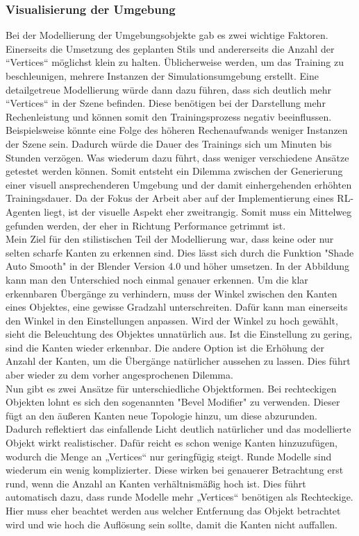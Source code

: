 \subsubsection{Visualisierung der Umgebung}
\label{vis_umgebung}
Bei der Modellierung der Umgebungsobjekte gab es zwei wichtige Faktoren. Einerseits die Umsetzung des geplanten Stils und andererseits die Anzahl der “Vertices“ möglichst klein zu halten. Üblicherweise werden, um das Training zu beschleunigen, mehrere Instanzen der Simulationsumgebung erstellt. Eine detailgetreue Modellierung würde dann dazu führen, dass sich deutlich mehr “Vertices“ in der Szene befinden. Diese benötigen bei der Darstellung mehr Rechenleistung und können somit den Trainingsprozess negativ beeinflussen. Beispielsweise könnte eine Folge des höheren Rechenaufwands weniger Instanzen der Szene sein. Dadurch würde die Dauer des Trainings sich um Minuten bis Stunden verzögen. Was wiederum dazu führt, dass weniger verschiedene Ansätze getestet werden können. Somit entsteht ein Dilemma zwischen der Generierung einer visuell ansprechenderen Umgebung und der damit einhergehenden erhöhten Trainingsdauer. Da der Fokus der Arbeit aber auf der Implementierung eines RL-Agenten liegt, ist der visuelle Aspekt eher zweitrangig. Somit muss ein Mittelweg gefunden werden, der eher in Richtung Performance getrimmt ist. 
\\
Mein Ziel für den stilistischen Teil der Modellierung war, dass keine oder nur selten scharfe Kanten zu erkennen sind. Dies lässt sich durch die Funktion "Shade Auto Smooth" in der Blender Version 4.0 und höher umsetzen. In der Abbildung kann man den Unterschied noch einmal genauer erkennen. Um die klar erkennbaren Übergänge zu verhindern, muss der Winkel zwischen den Kanten eines Objektes, eine gewisse Gradzahl unterschreiten. Dafür kann man einerseits den Winkel in den Einstellungen anpassen. Wird der Winkel zu hoch gewählt, sieht die Beleuchtung des Objektes unnatürlich aus. Ist die Einstellung zu gering, sind die Kanten wieder erkennbar. Die andere Option ist die Erhöhung der Anzahl der Kanten, um die Übergänge natürlicher aussehen zu lassen. Dies führt aber wieder zu dem vorher angesprochenen Dilemma. 
\\
Nun gibt es zwei Ansätze für unterschiedliche Objektformen. Bei rechteckigen Objekten lohnt es sich den sogenannten "Bevel Modifier" zu verwenden. Dieser fügt an den äußeren Kanten neue Topologie hinzu, um diese abzurunden. Dadurch reflektiert das einfallende Licht deutlich natürlicher und das modellierte Objekt wirkt realistischer. Dafür reicht es schon wenige Kanten hinzuzufügen, wodurch die Menge an „Vertices“ nur geringfügig steigt. Runde Modelle sind wiederum ein wenig komplizierter. Diese wirken bei genauerer Betrachtung erst rund, wenn die Anzahl an Kanten verhältnismäßig hoch ist. Dies führt automatisch dazu, dass runde Modelle mehr „Vertices“ benötigen als Rechteckige. Hier muss eher beachtet werden aus welcher Entfernung das Objekt betrachtet wird und wie hoch die Auflösung sein sollte, damit die Kanten nicht auffallen. 
